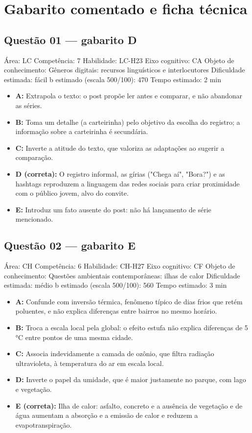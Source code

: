 \documentclass[10pt,a4paper,twocolumn]{article}
\begin{document}
\section*{Gabarito comentado e ficha técnica}
\subsection*{Questão 01 — gabarito D}
{\small Área: LC \textbullet{} Competência: 7 \textbullet{} Habilidade: LC-H23 \textbullet{} Eixo cognitivo: CA \textbullet{} Objeto de conhecimento: Gêneros digitais: recursos linguísticos e interlocutores \textbullet{} Dificuldade estimada: fácil \textbullet{} b estimado (escala 500/100): 470 \textbullet{} Tempo estimado: 2 min}\par
\begin{itemize}[leftmargin=1.5em,itemsep=1pt]
\item \textbf{A:} Extrapola o texto: o post propõe ler antes e comparar, e não abandonar as séries.
\item \textbf{B:} Toma um detalhe (a carteirinha) pelo objetivo da escolha do registro; a informação sobre a carteirinha é secundária.
\item \textbf{C:} Inverte a atitude do texto, que valoriza as adaptações ao sugerir a comparação.
\item \textbf{D (correta):} O registro informal, as gírias ("Chega aí", "Bora?") e as hashtags reproduzem a linguagem das redes sociais para criar proximidade com o público jovem, alvo do convite.
\item \textbf{E:} Introduz um fato ausente do post: não há lançamento de série mencionado.
\end{itemize}
\subsection*{Questão 02 — gabarito E}
{\small Área: CH \textbullet{} Competência: 6 \textbullet{} Habilidade: CH-H27 \textbullet{} Eixo cognitivo: CF \textbullet{} Objeto de conhecimento: Questões ambientais contemporâneas: ilhas de calor \textbullet{} Dificuldade estimada: médio \textbullet{} b estimado (escala 500/100): 560 \textbullet{} Tempo estimado: 3 min}\par
\begin{itemize}[leftmargin=1.5em,itemsep=1pt]
\item \textbf{A:} Confunde com inversão térmica, fenômeno típico de dias frios que retém poluentes, e não explica diferenças entre bairros no mesmo horário.
\item \textbf{B:} Troca a escala local pela global: o efeito estufa não explica diferenças de 5 °C entre pontos de uma mesma cidade.
\item \textbf{C:} Associa indevidamente a camada de ozônio, que filtra radiação ultravioleta, à temperatura do ar em escala local.
\item \textbf{D:} Inverte o papel da umidade, que é maior justamente no parque, com lago e vegetação.
\item \textbf{E (correta):} Ilha de calor: asfalto, concreto e a ausência de vegetação e de água aumentam a absorção e a emissão de calor e reduzem a evapotranspiração.
\end{itemize}
\end{document}

